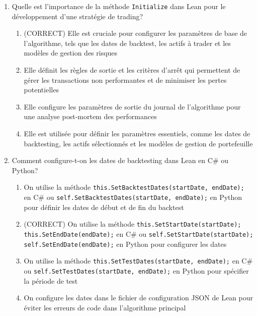 \documentclass[a4paper,12pt]{article}
\begin{document}
\begin{enumerate}
    \item Quelle est l'importance de la méthode \texttt{Initialize} dans Lean pour le développement d'une stratégie de trading?
    \begin{enumerate}[label=(\Alph*)]
        \item (CORRECT) Elle est cruciale pour configurer les paramètres de base de l'algorithme, tels que les dates de backtest, les actifs à trader et les modèles de gestion des risques
        \item Elle définit les règles de sortie et les critères d'arrêt qui permettent de gérer les transactions non performantes et de minimiser les pertes potentielles
        \item Elle configure les paramètres de sortie du journal de l'algorithme pour une analyse post-mortem des performances
        \item Elle est utilisée pour définir les paramètres essentiels, comme les dates de backtesting, les actifs sélectionnés et les modèles de gestion de portefeuille
    \end{enumerate}

    \item Comment configure-t-on les dates de backtesting dans Lean en C\# ou Python?
    \begin{enumerate}[label=(\Alph*)]
        \item On utilise la méthode \texttt{this.SetBacktestDates(startDate, endDate);} en C\# ou \texttt{self.SetBacktestDates(startDate, endDate);} en Python pour définir les dates de début et de fin du backtest
        \item (CORRECT) On utilise la méthode \texttt{this.SetStartDate(startDate); this.SetEndDate(endDate);} en C\# ou \texttt{self.SetStartDate(startDate); self.SetEndDate(endDate);} en Python pour configurer les dates
        \item On utilise la méthode \texttt{this.SetTestDates(startDate, endDate);} en C\# ou \texttt{self.SetTestDates(startDate, endDate);} en Python pour spécifier la période de test
        \item On configure les dates dans le fichier de configuration JSON de Lean pour éviter les erreurs de code dans l'algorithme principal
    \end{enumerate}


\end{enumerate}
\end{document}
